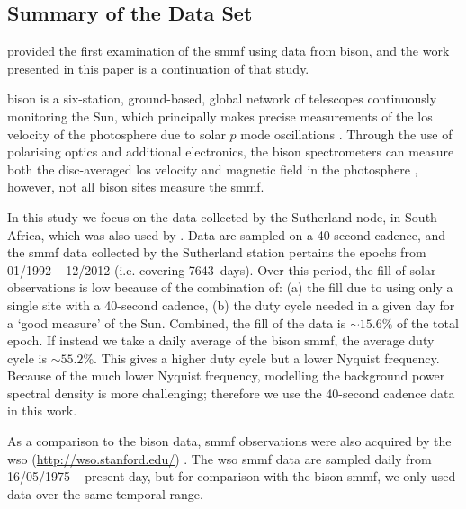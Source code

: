\subsection{Summary of the Data Set}

\citet{chaplin_studies_2003} provided the first examination of the \gls{smmf} using data from \gls{bison}, and the work presented in this paper is a continuation of that study.

\gls{bison} is a six-station, ground-based, global network of telescopes continuously monitoring the Sun, which principally makes precise measurements of the \gls{los} velocity of the photosphere due to solar $p$ mode oscillations \citep{hale_performance_2016}. Through the use of polarising optics and additional electronics, the \gls{bison} spectrometers can measure both the disc-averaged \gls{los} velocity and magnetic field in the photosphere \citep{chaplin_studies_2003}, however, not all \gls{bison} sites measure the \gls{smmf}. %

In this study we focus on the data collected by the Sutherland node, in South Africa, which was also used by \cite{chaplin_studies_2003}. Data are sampled on a 40-second cadence, and the \gls{smmf} data collected by the Sutherland station pertains the epochs from 01/1992 -- 12/2012 (i.e. covering 7643~days). Over this period, the fill of solar observations is low because of the combination of: (a) the fill due to using only a single site with a 40-second cadence, (b) the duty cycle needed in a given day for a `good measure' of the Sun. Combined, the fill of the data is $\sim 15.6\%$ of the total epoch. If instead we take a daily average of the \gls{bison} \gls{smmf}, the average duty cycle is $\sim 55.2\%$. This gives a higher duty cycle but a lower Nyquist frequency. Because of the much lower Nyquist frequency, modelling the background power spectral density is more challenging; therefore we use the 40-second cadence data in this work.

As a comparison to the \gls{bison} data, \gls{smmf} observations were also acquired by the \gls{wso} (\url{http://wso.stanford.edu/}) \citep{scherrer_mean_1977-1}. The \gls{wso} \gls{smmf} data are sampled daily from 16/05/1975 -- present day, but for comparison with the \gls{bison} \gls{smmf}, we only used data over the same temporal range.

